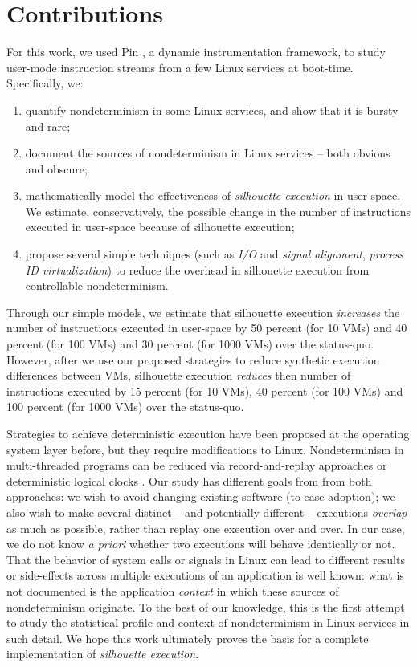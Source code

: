 \section{Contributions}
For this work, we used Pin \cite{luk2005pin},
a dynamic instrumentation framework,
to study user-mode instruction streams from 
a few Linux services at boot-time. 
Specifically, we:
\begin {enumerate}
\item quantify nondeterminism in some Linux services, and show that it is
  bursty and rare;
\item document the sources of nondeterminism in Linux services -- both obvious and obscure;
\item mathematically model the effectiveness
  of {\em silhouette execution} in user-space. We estimate, conservatively, the possible change in the number of instructions
  executed in user-space because of silhouette execution;
\item propose several simple techniques (such as {\em I/O} and {\em signal alignment}, {\em process ID virtualization})
  to reduce the overhead in silhouette execution from controllable nondeterminism.
\end {enumerate}

Through our simple models, we estimate that silhouette execution {\em increases} the number
of instructions executed in user-space by 50 percent (for 10 VMs) and 40 percent
(for 100 VMs) and 30 percent (for 1000 VMs) over the status-quo. However, after we
use our proposed strategies to reduce synthetic execution differences
between VMs, silhouette execution {\em reduces} then number of instructions executed
by 15 percent (for 10 VMs), 40 percent (for 100 VMs) and 100 percent (for 1000 VMs)
over the status-quo.

Strategies to achieve deterministic execution have been proposed at the operating system layer \cite{bergan2010dos} before,
but they require modifications to Linux. Nondeterminism in multi-threaded programs 
can be reduced via record-and-replay approaches \cite{patil2010pinplay} or deterministic logical clocks \cite{marek2011scaling}. 
Our study has different goals from from both approaches: we wish to avoid changing existing 
software (to ease adoption); we also wish to make several distinct -- and potentially different -- executions \emph{overlap} as much as possible, 
rather than replay one execution over and over.
In our case, we do not know \emph{a priori} whether two executions 
will behave identically or not. That the behavior of system calls or signals in Linux can lead to different results or side-effects across
multiple executions of an application is well known: what is not documented is the application \emph{context} in
which these sources of nondeterminism originate. To the best of our knowledge, this is
the first attempt to study the statistical profile and context of nondeterminism in Linux services
in such detail. We hope this work ultimately proves the basis for a complete implementation of {\em silhouette execution}.


